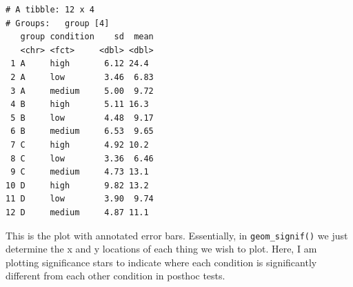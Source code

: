 \documentclass[
  letterpaper,
  DIV=11,
  numbers=noendperiod]{scrreprt}
\begin{document}
\begin{verbatim}
# A tibble: 12 x 4
# Groups:   group [4]
   group condition    sd  mean
   <chr> <fct>     <dbl> <dbl>
 1 A     high       6.12 24.4 
 2 A     low        3.46  6.83
 3 A     medium     5.00  9.72
 4 B     high       5.11 16.3 
 5 B     low        4.48  9.17
 6 B     medium     6.53  9.65
 7 C     high       4.92 10.2 
 8 C     low        3.36  6.46
 9 C     medium     4.73 13.1 
10 D     high       9.82 13.2 
11 D     low        3.90  9.74
12 D     medium     4.87 11.1 
\end{verbatim}

This is the plot with annotated error bars. Essentially, in
\texttt{geom\_signif()} we just determine the x and y locations of each
thing we wish to plot. Here, I am plotting significance stars to
indicate where each condition is significantly different from each other
condition in posthoc tests.
\end{document}
